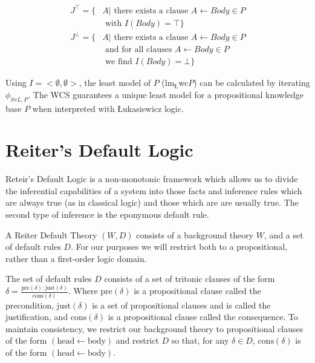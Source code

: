 \[
\begin{split}
J^\top = \{ & A | \textrm{ there exists a clause } A\leftarrow Body \in P \\ & \textrm{ with } I(Body) = \top\}
\end{split}
\]
\[
\begin{split}
J^\bot = \{ &  A | \textrm{ there exists a clause } A \leftarrow Body \in P \\
           & \textrm{ and for all clauses } A \leftarrow Body \in P \\ & \textrm{ we find } I(Body) = \bot\}
\end{split}
\]

Using $I=<\emptyset, \emptyset>$, the least model of $P$ ($\textrm{lm}_\textrm{\L}$wc$P$) can be calculated by iterating $\phi_{SvL,P}$. The WCS guarantees a unique least model for a propositional knowledge base $P$ when interpreted with \L ukasiewicz logic.

\section{Reiter's Default Logic} \label{ssec:reiter}
Reteir's Default Logic \citep{reiter1980logic} is a non-monotonic framework which allows us to divide the inferential capabilities of a system into those facts and inference rules which are always true (as in classical logic) and those which are are usually true. The second type of inference is the eponymous default rule.

A Reiter Default Theory $(W,D)$ consists of a background theory $W$, and a set of default rules
$D$. For our purposes we will restrict both to a propositional, rather than a first-order logic domain. 

The set of default rules $D$ consists of a set of tritonic clauses of the form $\delta=\frac{\text{pre}(\delta):\text{just}(\delta)}{\text{cons}(\delta)}$. Where $\text{pre}(\delta)$ is a propositional clause called the precondition, $\text{just}(\delta)$ is a set of propositional clauses and is called the justification, and $\text{cons}(\delta)$ is a propositional clause called the consequence. To maintain consistency, we restrict our background theory to propositional clauses of the form $(\text{head}\leftarrow \text{body})$ and restrict $D$ so that, for any $\delta \in D$, $\text{cons}(\delta)$ is of the form $(\text{head}\leftarrow \text{body})$.%


